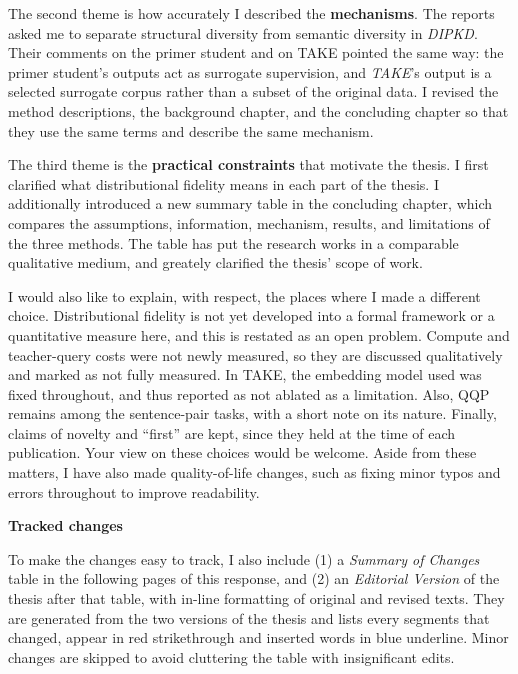 \documentclass[12pt,a4paper]{article}
\newenvironment{foldable}{}{}
\begin{document}
\begin{foldable}
  The second theme is how accurately I described the \textbf{mechanisms}.
  The reports asked me to separate structural diversity from semantic diversity in \textit{DIPKD}.
  Their comments on the primer student and on TAKE pointed the same way: the primer student's outputs act as surrogate supervision, and \textit{TAKE}'s output is a selected surrogate corpus rather than a subset of the original data.
  I revised the method descriptions, the background chapter, and the concluding chapter so that they use the same terms and describe the same mechanism.
\end{foldable}

\begin{foldable}
  The third theme is the \textbf{practical constraints} that motivate the thesis.
  I first clarified what distributional fidelity means in each part of the thesis.
  I additionally introduced a new summary table in the concluding chapter, which compares the assumptions, information, mechanism, results, and limitations of the three methods.
  The table has put the research works in a comparable qualitative medium, and greately clarified the thesis' scope of work.
\end{foldable}

\begin{foldable}
  I would also like to explain, with respect, the places where I made a different choice.
  Distributional fidelity is not yet developed into a formal framework or a quantitative measure here, and this is restated as an open problem.
  Compute and teacher-query costs were not newly measured, so they are discussed qualitatively and marked as not fully measured.
  In TAKE, the embedding model used was fixed throughout, and thus reported as not ablated as a limitation.
  Also, QQP remains among the sentence-pair tasks, with a short note on its nature.
  Finally, claims of novelty and ``first'' are kept, since they held at the time of each publication.
  Your view on these choices would be welcome.
  Aside from these matters, I have also made quality-of-life changes, such as fixing minor typos and errors throughout to improve readability.
\end{foldable}

\begin{foldable}
  \vspace{0.3cm}
  \textbf{\large Tracked changes}
\end{foldable}

\begin{foldable}
  To make the changes easy to track, I also include (1) a \textit{Summary of Changes} table in the following pages of this response, and (2) an \textit{Editorial Version} of the thesis after that table, with in-line formatting of original and revised texts.
  They are generated from the two versions of the thesis and lists every segments that changed, appear in red strikethrough and inserted words in blue underline.
  Minor changes are skipped to avoid cluttering the table with insignificant edits.
\end{foldable}
\end{document}
